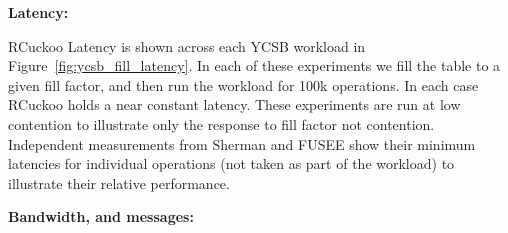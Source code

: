 \textbf{Latency:} 

RCuckoo Latency is shown across each YCSB workload in
Figure~\ref{fig:ycsb_fill_latency}. In each of these
experiments we fill the table to a given fill factor, and
then run the workload for 100k operations. In each case
RCuckoo holds a near constant latency. These experiments are
run at low contention to illustrate only the response to
fill factor not contention. Independent measurements from
Sherman and FUSEE show their minimum latencies for
individual operations (not taken as part of the workload) to
illustrate their relative performance.


\textbf{Bandwidth, and messages:} 

